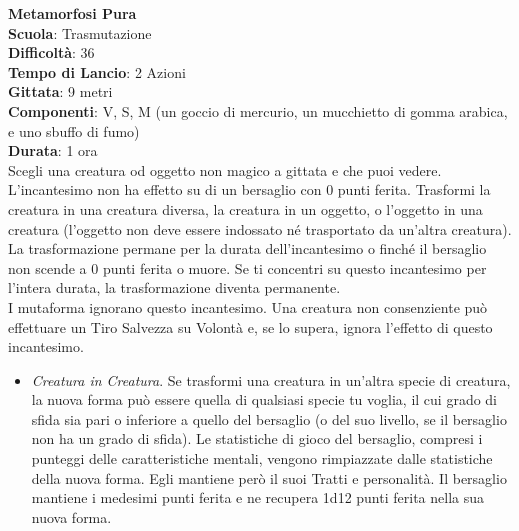\begin{multicols}{2}
\medskip\textbf{Metamorfosi Pura}\\
\textbf{Scuola}: Trasmutazione\\
\textbf{Difficoltà}: 36\\
\textbf{Tempo di Lancio}: 2 Azioni\\
\textbf{Gittata}: 9 metri\\
\textbf{Componenti}: V, S, M (un goccio di mercurio, un mucchietto di gomma arabica, e uno sbuffo di fumo) \\
\textbf{Durata}: 1 ora \\
Scegli una creatura od oggetto non magico a gittata e che puoi vedere. L'incantesimo non ha effetto su di un bersaglio con 0 punti ferita. Trasformi la creatura in una creatura diversa, la creatura in un oggetto, o l'oggetto in una creatura (l'oggetto non deve essere indossato né trasportato da un'altra creatura). La trasformazione permane per la durata dell'incantesimo o finché il bersaglio non scende a 0 punti ferita o muore. Se ti concentri su questo incantesimo per l'intera durata, la trasformazione diventa permanente.\\
I mutaforma ignorano questo incantesimo. Una creatura non consenziente può effettuare un Tiro Salvezza su Volontà e, se lo supera, ignora l'effetto di questo incantesimo.\\
\medskip\begin{itemize}
\item
\textit{Creatura in Creatura}. Se trasformi una creatura in un'altra specie di creatura, la nuova forma può essere quella di qualsiasi specie tu voglia, il cui grado di sfida sia pari o inferiore a quello del bersaglio (o del suo livello, se il bersaglio non ha un grado di sfida). Le statistiche di gioco del bersaglio, compresi i punteggi delle caratteristiche mentali, vengono rimpiazzate dalle statistiche della nuova forma. Egli mantiene però il suoi Tratti e personalità. Il bersaglio mantiene i medesimi punti ferita e ne recupera 1d12 punti ferita nella sua nuova forma.\\

\end{itemize}
\end{multicols}
